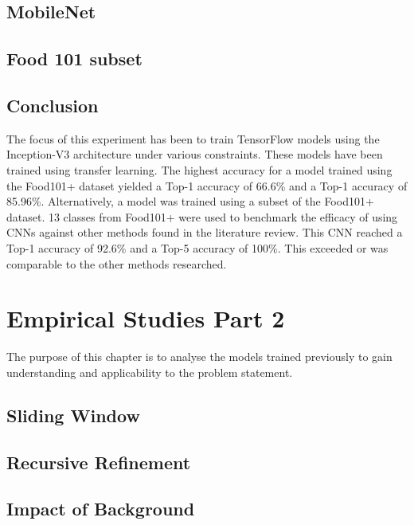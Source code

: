 \section{MobileNet}
\label{mobilenet}


\section{Food 101 subset}
\label{subset}


\section{Conclusion}
The focus of this experiment has been to train TensorFlow models using the Inception-V3 architecture under various constraints.
These models have been trained using transfer learning.
The highest accuracy for a model trained using the Food101+ dataset yielded a Top-1 accuracy of 66.6\% and a Top-1 accuracy of 85.96\%.
Alternatively, a model was trained using a subset of the Food101+ dataset.
13 classes from Food101+ were used to benchmark the efficacy of using CNNs against other methods found in the literature review.
This CNN reached a Top-1 accuracy of 92.6\% and a Top-5 accuracy of 100\%.
This exceeded or was comparable to the other methods researched.

\chapter{Empirical Studies Part 2}
The purpose of this chapter is to analyse the models trained previously to gain understanding and applicability to the problem statement.

\section{Sliding Window}
\label{slidingWindow}


\section{Recursive Refinement}
\label{RR}


\section{Impact of Background}
\label{background}


